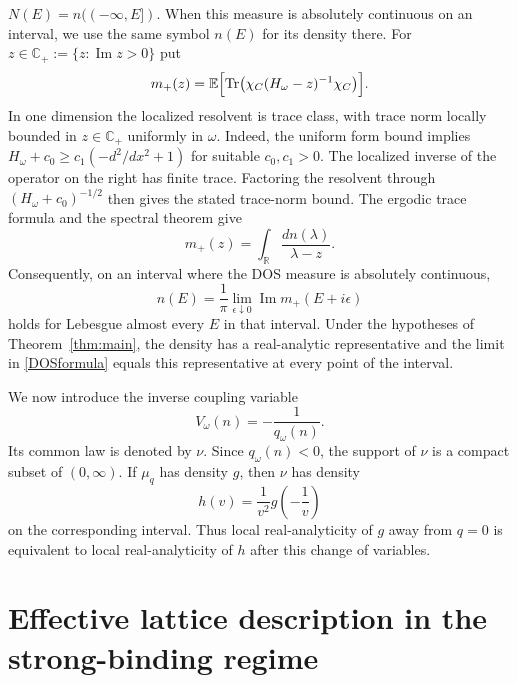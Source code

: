 \documentclass[12pt,a4paper]{article}
\numberwithin{equation}{section}
\newcommand{\Tr}{\operatorname{Tr}}
\newcommand{\E}{\mathbb E}
\newcommand{\R}{\mathbb R}
\newcommand{\C}{\mathbb C}
\renewcommand{\Im}{\operatorname{Im}}
\begin{document}
$N(E)=n((-\infty,E])$.  When this measure is absolutely continuous on an
interval, we use the same symbol $n(E)$ for its density there.  For
$z\in\C_+:=\{z:\Im z>0\}$ put
\begin{equation}
m_+(z)=\E\Bigl[\Tr\bigl(\chi_C(H_\omega-z)^{-1}\chi_C\bigr)\Bigr].
\label{mplus}
\end{equation}
In one dimension the localized resolvent is trace class, with trace norm
locally bounded in $z\in\C_+$ uniformly in $\omega$.  Indeed, the uniform form
bound implies $H_\omega+c_0\ge c_1(-d^2/dx^2+1)$ for suitable $c_0,c_1>0$.
The localized inverse of the operator on the right has finite trace.
Factoring the resolvent through $(H_\omega+c_0)^{-1/2}$ then gives the stated
trace-norm bound.  The ergodic trace formula and the spectral theorem give
\begin{equation}
m_+(z)=\int_\R\frac{d n(\lambda)}{\lambda-z}.
\label{Stieltjes}
\end{equation}
Consequently, on an interval where the DOS measure is absolutely continuous,
\begin{equation}
n(E)=\frac{1}{\pi}\lim_{\epsilon\downarrow0}
\Im m_+(E+i\epsilon)
\label{DOSformula}
\end{equation}
holds for Lebesgue almost every $E$ in that interval.  Under the hypotheses
of Theorem~\ref{thm:main}, the density has a real-analytic representative
and the limit in \eqref{DOSformula} equals this representative at every point
of the interval.

We now introduce the inverse coupling variable
\begin{equation}
V_\omega(n)=-\frac{1}{q_\omega(n)}.
\label{inverse-coupling}
\end{equation}
Its common law is denoted by $\nu$.  Since $q_\omega(n)<0$, the support of
$\nu$ is a compact subset of $(0,\infty)$.  If $\mu_q$ has density $g$, then
$\nu$ has density
\begin{equation}
h(v)=\frac{1}{v^2}g\left(-\frac{1}{v}\right)
\label{density-transform}
\end{equation}
on the corresponding interval.  Thus local real-analyticity of $g$ away from
$q=0$ is equivalent to local real-analyticity of $h$ after this change of
variables.

\section{Effective lattice description in the strong-binding regime}\label{sec:krein}
\end{document}
